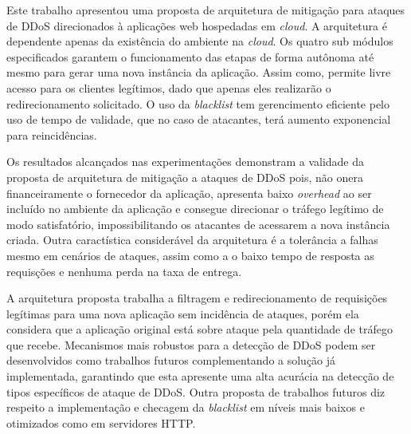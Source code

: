 
Este trabalho apresentou uma proposta de arquitetura de mitigação para ataques de DDoS direcionados à aplicações web hospedadas em \emph{cloud}. A arquitetura é dependente apenas da existência do ambiente na \emph{cloud}. Os quatro sub módulos especificados garantem o funcionamento das etapas de forma autônoma até mesmo para gerar uma nova instância da aplicação. Assim como, permite livre acesso para os clientes legítimos, dado que apenas eles realizarão o redirecionamento solicitado. O uso da \emph{blacklist} tem gerencimento eficiente pelo uso de tempo de validade, que no caso de atacantes, terá aumento exponencial para reincidências.

Os resultados alcançados nas experimentações demonstram a validade da proposta de arquitetura de mitigação a ataques de DDoS pois, não onera financeiramente o fornecedor da aplicação, apresenta baixo \emph{overhead} ao ser incluído no ambiente da aplicação e consegue direcionar o tráfego legítimo de modo satisfatório, impossibilitando os atacantes de acessarem a nova instância criada.
Outra caractística considerável da arquitetura é a tolerância a falhas mesmo em cenários de ataques, assim como a o baixo tempo de resposta as requisções e nenhuma perda na taxa de entrega.   

A arquitetura proposta trabalha a filtragem e redirecionamento de requisições legítimas para uma nova aplicação sem incidência de ataques, porém ela considera que a aplicação original está sobre ataque pela quantidade de tráfego que recebe. Mecanismos mais robustos para a detecção de DDoS podem ser desenvolvidos como trabalhos futuros complementando a solução já implementada, garantindo que esta apresente uma alta acurácia na detecção de tipos específicos de ataque de DDoS. Outra proposta de trabalhos futuros diz respeito a implementação e checagem da \emph{blacklist} em níveis mais baixos e otimizados como em servidores HTTP.
